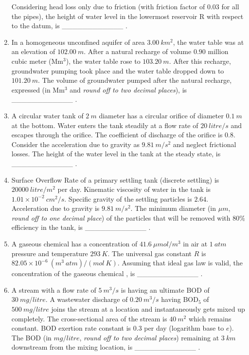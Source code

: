 \documentclass[journal]{IEEEtran}
\begin{document}
\begin{enumerate}
Considering head loss only due to friction (with friction factor of $0.03$ for all the pipes), the height of water level in the lowermost reservoir R  with respect to the datum, is \_\_\_\_\_\_\_\_\_\_\_\_ . \hfill {}

\item In a homogeneous unconfined aquifer of area $3.00 \ km^2$, the water table was at an elevation of $102.00 \ m$. After a natural recharge of volume $0.90$ million cubic meter (Mm$^3$), the water table rose to $103.20 \ m$. After this recharge, groundwater pumping took place and the water table dropped down to $101.20 \ m$. The volume of groundwater pumped after the natural recharge, expressed (in Mm$^3$ and \textit{round off to two decimal places}), is \_\_\_\_\_\_\_\_\_\_\_\_ . \hfill {}
\item A circular water tank of $2 \ m$ diameter has a circular orifice of diameter $0.1 \ m$ at the bottom. Water enters the tank steadily at a flow rate of $20 \ litre/s$ and escapes through the orifice. The coefficient of discharge of the orifice is $0.8$. Consider the acceleration due to gravity as $9.81 \ m/s^2$ and neglect frictional losses. The height of the water level  in the tank at the steady state, is \_\_\_\_\_\_\_\_\_\_\_\_ . \hfill {}

\item Surface Overflow Rate  of a primary settling tank (discrete settling) is $20000 \ litre/m^2$ per day. Kinematic viscosity of water in the tank is $1.01 \times 10^{-2} \ cm^2/s$. Specific gravity of the settling particles is $2.64$. Acceleration due to gravity is $9.81 \ m/s^2$. The minimum diameter (in $\mu m$, \textit{round off to one decimal place}) of the particles that will be removed with $80\%$ efficiency in the tank, is \_\_\_\_\_\_\_\_\_\_\_\_ . \hfill {}

\item A gaseous chemical has a concentration of $41.6 \ \mu mol/m^3$ in air at $1 \ atm$ pressure and temperature $293 \ K$. The universal gas constant $R$ is $82.05 \times 10^{-6} \ (m^3 \ atm)/(mol \ K)$. Assuming that ideal gas law is valid, the concentration of the gaseous chemical , is \_\_\_\_\_\_\_\_\_\_\_\_ . \hfill {}

\item A stream with a flow rate of $5 \ m^3/s$ is having an ultimate BOD of $30 \ mg/litre$. A wastewater discharge of $0.20 \ m^3/s$ having BOD$_5$ of $500 \ mg/litre$ joins the stream at a location and instantaneously gets mixed up completely. The cross-sectional area of the stream is $40 \ m^2$ which remains constant. BOD exertion rate constant is $0.3$ per day (logarithm base to $e$). The BOD (in $mg/litre$, \textit{round off to two decimal places}) remaining at $3 \ km$ downstream from the mixing location, is \_\_\_\_\_\_\_\_\_\_\_\_ . \hfill {}


\end{enumerate}
\end{document}

